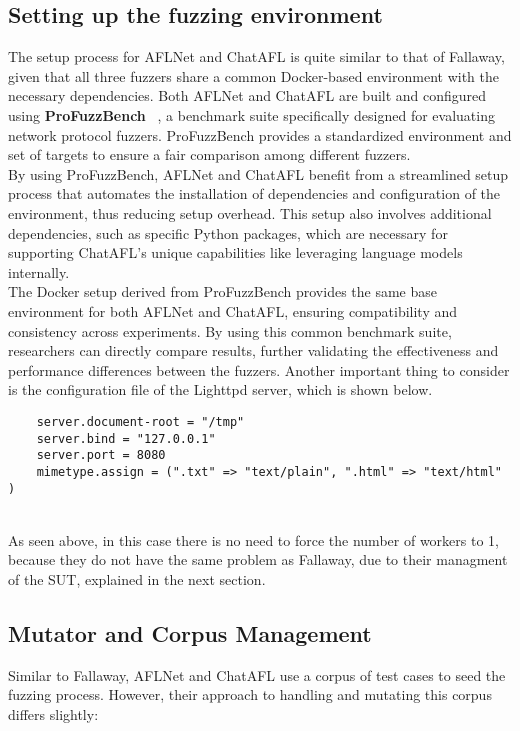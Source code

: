 \subsection{Setting up the fuzzing environment}

The setup process for AFLNet and ChatAFL is quite similar to that of Fallaway, given that all three fuzzers share a common Docker-based environment with the necessary dependencies. Both AFLNet and ChatAFL are built and configured using \textbf{ProFuzzBench} ~\cite{profuzzbench}, a benchmark suite specifically designed for evaluating network protocol fuzzers. ProFuzzBench provides a standardized environment and set of targets to ensure a fair comparison among different fuzzers.
\\By using ProFuzzBench, AFLNet and ChatAFL benefit from a streamlined setup process that automates the installation of dependencies and configuration of the environment, thus reducing setup overhead. This setup also involves additional dependencies, such as specific Python packages, which are necessary for supporting ChatAFL's unique capabilities like leveraging language models internally.
\\The Docker setup derived from ProFuzzBench provides the same base environment for both AFLNet and ChatAFL, ensuring compatibility and consistency across experiments. By using this common benchmark suite, researchers can directly compare results, further validating the effectiveness and performance differences between the fuzzers.
Another important thing to consider is the configuration file of the Lighttpd server, which is shown below.\\
\begin{lstlisting}
    server.document-root = "/tmp"
    server.bind = "127.0.0.1"
    server.port = 8080
    mimetype.assign = (".txt" => "text/plain", ".html" => "text/html" )
\end{lstlisting}
\phantom{}\\
As seen above, in this case there is no need to force the number of workers to 1, because they do not have the same problem as Fallaway, due to their managment of the SUT, explained in the next section.

\subsection{Mutator and Corpus Management}

Similar to Fallaway, AFLNet and ChatAFL use a corpus of test cases to seed the fuzzing process. However, their approach to handling and mutating this corpus differs slightly:

